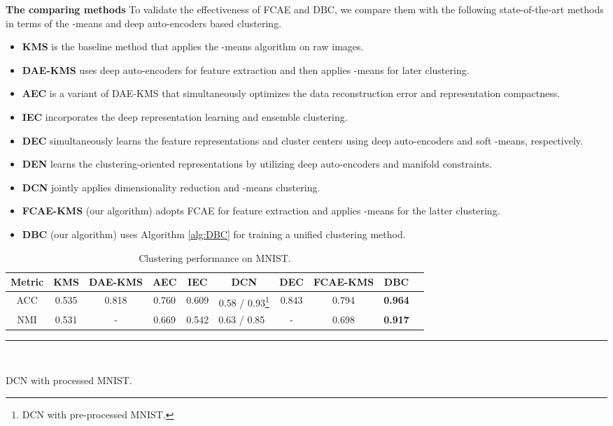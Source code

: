 \documentclass[preprint,12pt]{elsarticle}
\begin{document}
\textbf{The comparing methods} To validate the effectiveness of FCAE and DBC, we compare them with the following
state-of-the-art methods in terms of the -means and deep auto-encoders based clustering.
\begin{itemize}
\item \textbf{KMS} is the baseline method that applies the -means algorithm on raw images.
\item \textbf{DAE-KMS} \cite{Xie2015DEC} uses deep auto-encoders for feature extraction and then
     applies -means for later clustering.
\item \textbf{AEC} \cite{Song2013AEC} is a variant of DAE-KMS that simultaneously optimizes
   the data reconstruction error and representation compactness.
\item \textbf{IEC} \cite{Liu2016IEC} incorporates the deep representation learning and ensemble clustering.
\item \textbf{DEC} \cite{Xie2015DEC} simultaneously learns the feature representations and cluster centers
    using deep auto-encoders and soft -means, respectively.
\item \textbf{DEN} \cite{Huang2014DEN} learns the clustering-oriented representations by utilizing
    deep auto-encoders and manifold constraints.
\item \textbf{DCN} \cite{Yang2016DCN} jointly applies dimensionality reduction and -means clustering.
\item \textbf{FCAE-KMS} (our algorithm) adopts FCAE for feature extraction and applies -means for
     the latter clustering.
\item \textbf{DBC} (our algorithm) uses Algorithm \ref{alg:DBC} for training a unified clustering method.
\end{itemize}

\begin{table}[!b]
\begin{center}
\begin{scriptsize}
\caption{Clustering performance on MNIST.}
\text{~~~~~~~~~~~~~~~~~~~~~~~~~~~~~~~~~~~~~~~~}
\label{tab:benchmarks-mnist}
\begin{tabular}{cccccccccc} \toprule
Metric & KMS & DAE-KMS  & AEC & IEC & DCN  & DEC & FCAE-KMS & DBC \\
\midrule
ACC & 0.535 &0.818 & 0.760 & 0.609 & 0.58 / 0.93\footnote{DCN with pre-processed MNIST.}&0.843 & 0.794&\textbf{0.964}\\
NMI & 0.531 & - & 0.669 & 0.542 & 0.63 / 0.85~ & - & 0.698 & \textbf{0.917} \\
\bottomrule
\end{tabular}
\end{scriptsize}
\end{center}
\noindent\rule{4cm}{0.4pt} \\
\begin{footnotesize}
\text{~~}DCN with processed MNIST.
\end{footnotesize}
\end{table}
\end{document}
